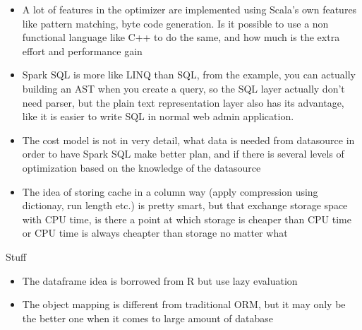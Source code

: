 \documentclass[12pt,a4paper,oneside]{article}
\begin{document}
\begin{itemize}
  \item A lot of features in the optimizer are implemented using Scala's own features like pattern matching, byte code generation.
  Is it possible to use a non functional language like C++ to do the same, and how much is the extra effort and performance gain
  \item Spark SQL is more like LINQ than SQL, from the example, you can actually building an AST when you create a query, so the
  SQL layer actually don't need parser, but the plain text representation layer also has its advantage, like it is easier to write
  SQL in normal web admin application.
  \item The cost model is not in very detail, what data is needed from datasource in order to have Spark SQL make better plan, and
  if there is several levels of optimization based on the knowledge of the datasource
  \item The idea of storing cache in a column way (apply compression using dictionay, run length etc.) is pretty smart, but that 
  exchange storage space with CPU time, is there a point at which storage is cheaper than CPU time or CPU time is always cheapter
than storage no matter what 
\end{itemize}

Stuff

\begin{itemize}
  \item The dataframe idea is borrowed from R but use lazy evaluation
  \item The object mapping is different from traditional ORM, but it may only be the better one when it comes to large amount of database	  
\end{itemize}
\end{document}
